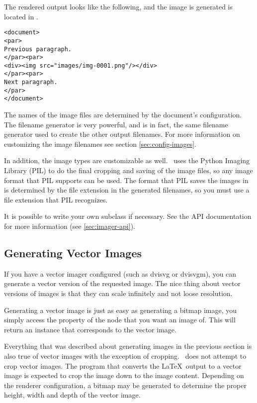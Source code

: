 The rendered output looks like the following, and the image is generated
is located in .
\begin{verbatim}
<document>
<par>
Previous paragraph.
</par><par>
<div><img src="images/img-0001.png"/></div>
</par><par>
Next paragraph.
</par>
</document>
\end{verbatim}

The names of the image files are determined by the document's configuration.
The filename generator is very powerful, and is in fact, the same filename
generator used to create the other output filenames.  For more information
on customizing the image filenames see section \ref{sec:config-images}.

In addition, the image types are customizable as well.  \plasTeX\ uses
the Python Imaging Library (PIL) to do the final cropping and saving of the
image files, so any image format that PIL supports can be used.  The
format that PIL saves the images in is determined by the file extension
in the generated filenames, so you must use a file extension that
PIL recognizes.

It is possible to write your own  subclass if necessary.
See the  API documentation for more information (see
\ref{sec:imager-api}).


\subsection{Generating Vector Images}

If you have a vector imager configured (such as dvisvg or dvisvgm), you
can generate a vector version of the requested image. The nice thing about
vector versions of images is that they can scale infinitely and not loose
resolution.

Generating a vector image is just as easy as generating a bitmap image,
you simply access the  property of the node that
you want an image of.  This will return an 
instance that corresponds to the vector image.

Everything that was described about generating images in the previous
section is also true of vector images with the exception of cropping.
\plasTeX\ does not attempt to crop vector images.  The program that
converts the \LaTeX\ output to a vector image is expected to crop the
image down to the image content.  Depending on the renderer configuration, a
bitmap may be generated to determine the proper height, width and depth of
the vector image.



